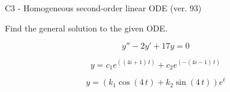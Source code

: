 \begin{exercise}
  \begin{exerciseTitle}C3 - Homogeneous second-order linear ODE (ver. 93)\end{exerciseTitle}
  \begin{exerciseStatement}
    
Find the general solution to the given ODE.

    
\[y''-2y'+17y = 0\]

  \end{exerciseStatement}
  \begin{exerciseAnswer}
    
\[y= c_{1} e^{\left(\left(4 i + 1\right) \, t\right)} + c_{2} e^{\left(-\left(4 i - 1\right) \, t\right)}\]

    
\[y= {\left(k_{1} \cos\left(4 \, t\right) + k_{2} \sin\left(4 \, t\right)\right)} e^{t}\]

  \end{exerciseAnswer}
\end{exercise}